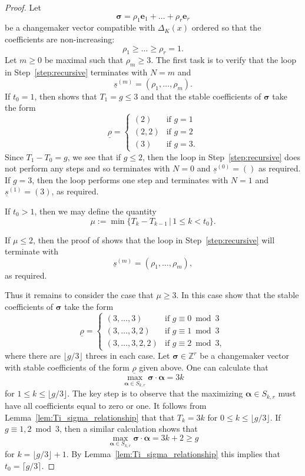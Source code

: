 \documentclass{amsart} %
\newcommand{\Z}{\mathbb{Z}}
\newcommand{\e}{\bm{e}}
\newcommand{\bsigma}{\bm{\sigma}}
\theoremstyle{thm}
\theoremstyle{definition}
\numberwithin{equation}{section}
\begin{document}
\begin{proof}
Let
\[\bsigma=\rho_1 \e_1 +\dots + \rho_r \e_r\]
be a changemaker vector compatible with $\Delta_K(x)$ ordered so that the coefficients are non-increasing:
\[
\rho_1\geq \dots \geq \rho_r=1.
\]
Let $m\geq 0$ be maximal such that $\rho_m \geq 3$. The first task is to verify that the loop in Step~\ref{step:recursive} terminates with $N=m$ and
\[
\underline{s}^{(m)}=(\rho_1, \dots, \rho_m).
\]
If $t_0=1$, then \cite[Lemma 2.12]{Mc17} shows that $T_1=g\leq 3$ and that the stable coefficients of $\bsigma$ take the form
\[
\underline{\rho}=
\begin{cases}
(2) &\text{if $g=1$}\\
(2,2) &\text{if $g=2$}\\
(3) &\text{if $g=3$}.
\end{cases}
\]
Since $T_1-T_0=g$, we see that if $g\leq 2$, then the loop in Step~\ref{step:recursive} does not perform any steps and so terminates with $N=0$ and $\underline{s}^{(0)}=()$ as required. If $g=3$, then the loop performs one step and terminates with $N=1$ and $\underline{s}^{(1)}=(3)$, as required.

If $t_0>1$, then we may define the quantity 
\[\mu:=\min\{T_k -T_{k-1} \, | \, 1\leq k < t_0 \}.\]

If $\mu\leq 2$, then the proof of \cite[Lemma 2.16]{Mc17} shows that the loop in Step~\ref{step:recursive} will terminate with
\[\underline{s}^{(m)}=(\rho_1, \dots, \rho_m),\]
as required.

Thus it remains to consider the case that $\mu\geq 3$. In this case \cite[Lemma~2.14 and Remark~2.15]{Mc17} show that the stable coefficients of $\bsigma$ take the form
\[
\underline{\rho}= \begin{cases}
(3, \dots ,3) &\text{if $g\equiv 0 \bmod 3$}\\
(3, \dots ,3,2) &\text{if $g\equiv 1 \bmod 3$}\\
(3, \dots ,3,2,2) &\text{if $g\equiv 2 \bmod 3$},
\end{cases}
\]
where there are $\lfloor g/3 \rfloor$ threes in each case. Let $\bsigma\in \Z^r$ be a changemaker vector with stable coefficients of the form $\underline{\rho}$ given above. One can calculate that
\[
\max_{\bm{\alpha}\in S_{k,r}}\bsigma\cdot \bm{\alpha}= 3k
\]
for $1\leq k\leq \lfloor g/3 \rfloor$. The key step is to observe that the maximizing $\bm{\alpha}\in S_{k,r}$ must have all coefficients equal to zero or one. It follows from Lemma~\ref{lem:Ti_sigma_relationship} that that $T_k=3k$ for $0\leq k\leq \lfloor g/3 \rfloor$. If $g\equiv 1,2\bmod 3$, then a similar calculation shows that 
\[
\max_{\bm{\alpha}\in S_{k,r}}\bsigma\cdot \bm{\alpha}= 3k+2\geq g
\]
for $k=\lfloor g/3 \rfloor+1$. By Lemma~\ref{lem:Ti_sigma_relationship} this implies that $t_0=\lceil g/3\rceil$. 


\end{proof}
\end{document}
